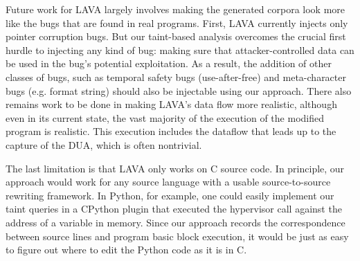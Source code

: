 
Future work for LAVA largely involves making the generated corpora look more like the bugs that are found in real programs. First, LAVA currently injects only pointer corruption bugs. But our taint-based analysis overcomes the crucial first hurdle to injecting any kind of bug: making sure that attacker-controlled data can be used in the bug's potential exploitation. As a result, the addition of other classes of bugs, such as temporal safety bugs (use-after-free) and meta-character bugs (e.g. format string) should also be injectable using our approach. There also remains work to be done in making LAVA's data flow more realistic, although even in its current state, the vast majority of the execution of the modified program is realistic. This execution includes the dataflow that leads up to the capture of the DUA, which is often nontrivial.

The last limitation is that LAVA only works on C source code. In principle, our approach would work for any source language with a usable source-to-source rewriting framework. In Python, for example, one could easily implement our taint queries in a CPython plugin that executed the hypervisor call against the address of a variable in memory. Since our approach records the correspondence between source lines and program basic block execution, it would be just as easy to figure out where to edit the Python code as it is in C.